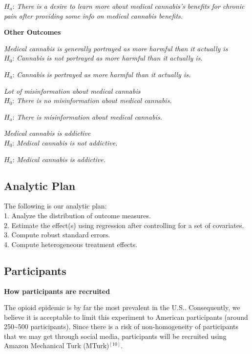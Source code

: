 \documentclass[
]{article}
\begin{document}
\(H_{a}\): \emph{There is a desire to learn more about medical
cannabis's benefits for chronic pain after providing some info on
medical cannabis benefits.}

\textbf{Other Outcomes}

\emph{Medical cannabis is generally portrayed as more harmful than it
actually is}\\
\(H_{0}\): \emph{Cannabis is not portrayed as more harmful than it
actually is.}

\(H_{a}\): \emph{Cannabis is portrayed as more harmful than it actually
is.}

\emph{Lot of misinformation about medical cannabis}\\
\(H_{0}\): \emph{There is no misinformation about medical cannabis.}

\(H_{a}\): \emph{There is misinformation about medical cannabis.}

\emph{Medical cannabis is addictive}\\
\(H_{0}\): \emph{Medical cannabis is not addictive.}

\(H_{a}\): \emph{Medical cannabis is addictive.}

\hypertarget{analytic-plan}{%
\subsection{Analytic Plan}\label{analytic-plan}}

The following is our analytic plan:\\
1. Analyze the distribution of outcome measures.\\
2. Estimate the effect(s) using regression after controlling for a set
of covariates.\\
3. Compute robust standard errors.\\
4. Compute heterogeneous treatment effects.

\hypertarget{participants}{%
\subsection{Participants}\label{participants}}

\textbf{How participants are recruited}

The opioid epidemic is by far the most prevalent in the U.S..
Consequently, we believe it is acceptable to limit this experiment to
American participants (around 250\textasciitilde500 participants). Since
there is a risk of non-homogeneity of participants that we may get
through social media, participants will be recruited using Amazon
Mechanical Turk (MTurk)\(^{[10]}\).
\end{document}
